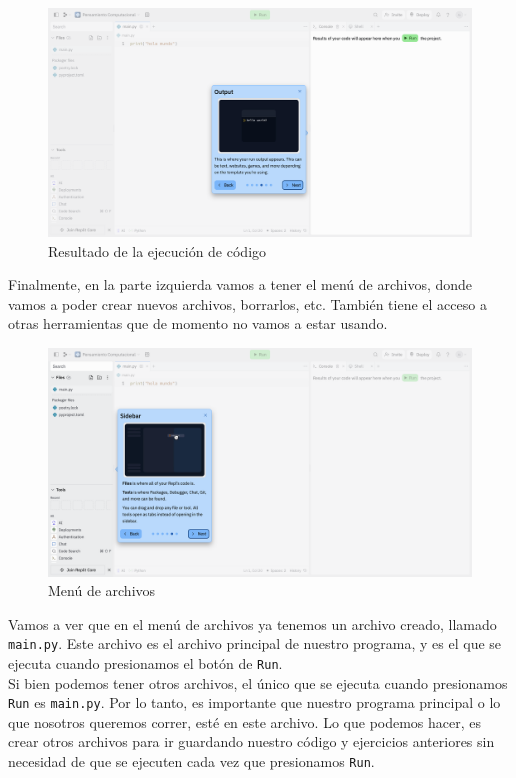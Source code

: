 \documentclass[
  letterpaper,
  DIV=11,
  numbers=noendperiod]{scrreprt}
\begin{document}
\begin{figure}

{\centering \includegraphics{./imgs/unidad_1/replit_workspace3.png}

}

\caption{Resultado de la ejecución de código}

\end{figure}

Finalmente, en la parte izquierda vamos a tener el menú de archivos,
donde vamos a poder crear nuevos archivos, borrarlos, etc. También tiene
el acceso a otras herramientas que de momento no vamos a estar usando.

\begin{figure}

{\centering \includegraphics{./imgs/unidad_1/replit_workspace4.png}

}

\caption{Menú de archivos}

\end{figure}

Vamos a ver que en el menú de archivos ya tenemos un archivo creado,
llamado \texttt{main.py}. Este archivo es el archivo principal de
nuestro programa, y es el que se ejecuta cuando presionamos el botón de
\texttt{Run}.\\
Si bien podemos tener otros archivos, el único que se ejecuta cuando
presionamos \texttt{Run} es \texttt{main.py}. Por lo tanto, es
importante que nuestro programa principal o lo que nosotros queremos
correr, esté en este archivo. Lo que podemos hacer, es crear otros
archivos para ir guardando nuestro código y ejercicios anteriores sin
necesidad de que se ejecuten cada vez que presionamos \texttt{Run}.
\end{document}
